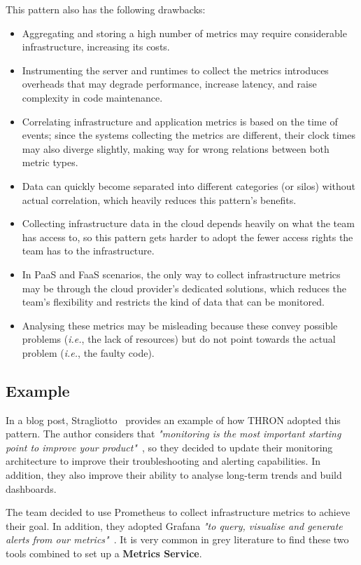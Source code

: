 \documentclass[runningheads]{llncs}
\begin{document}
\noindent This pattern also has the following drawbacks:
\begin{itemize}
    \item Aggregating and storing a high number of metrics may require considerable infrastructure, increasing its costs.
    \item Instrumenting the server and runtimes to collect the metrics introduces overheads that may degrade performance, increase latency, and raise complexity in code maintenance.     
    \item Correlating infrastructure and application metrics is based on the time of events; since the systems collecting the metrics are different, their clock times may also diverge slightly, making way for wrong relations between both metric types.
    \item Data can quickly become separated into different categories (or silos) without actual correlation, which heavily reduces this pattern's benefits.
    \item Collecting infrastructure data in the cloud depends heavily on what the team has access to, so this pattern gets harder to adopt the fewer access rights the team has to the infrastructure.
    \item In PaaS and FaaS scenarios, the only way to collect infrastructure metrics may be through the cloud provider's dedicated solutions, which reduces the team's flexibility and restricts the kind of data that can be monitored.
    \item Analysing these metrics may be misleading because these convey possible problems (\textit{i.e.}, the lack of resources) but do not point towards the actual problem (\textit{i.e.}, the faulty code).
\end{itemize}

\subsection{Example}
In a blog post, Stragliotto~\cite{Stragliotto-2019} provides an example of how THRON adopted this pattern. The author considers that \textit{"monitoring is the most important starting point to improve your product"}~\cite{Stragliotto-2019}, so they decided to update their monitoring architecture to improve their troubleshooting and alerting capabilities. In addition, they also improve their ability to analyse long-term trends and build dashboards.

The team decided to use Prometheus to collect infrastructure metrics to achieve their goal. 
In addition, they adopted Grafana \textit{"to query, visualise and generate alerts from our metrics"}~\cite{Stragliotto-2019}. It is very common in grey literature to find these two tools combined to set up a \textbf{Metrics Service}.
\end{document}
